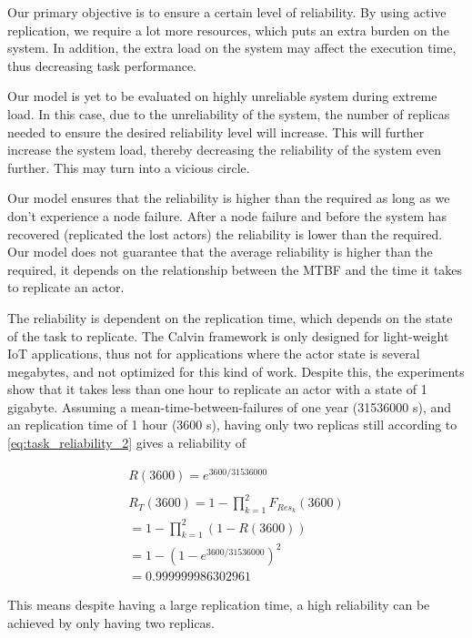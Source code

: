 \documentclass{cslthse-msc}
\begin{document}
Our primary objective is to ensure a certain level of reliability. By using active replication, we require a lot more resources, which puts an extra burden on the system. In addition, the extra load on the system may affect the execution time, thus decreasing task performance.

Our model is yet to be evaluated on highly unreliable system during extreme load. In this case, due to the unreliability of the system, the number of replicas needed to ensure the desired reliability level will increase. This will further increase the system load, thereby decreasing the reliability of the system even further. This may turn into a vicious circle.

Our model ensures that the reliability is higher than the required as long as we don't experience a node failure. After a node failure and before the system has recovered (replicated the lost actors) the reliability is lower than the required. Our model does not guarantee that the average reliability is higher than the required, it depends on the relationship between the MTBF and the time it takes to replicate an actor.

The reliability is dependent on the replication time, which depends on the state of the task to replicate. The Calvin framework is only designed for light-weight IoT applications, thus not for applications where the actor state is several megabytes, and not optimized for this kind of work. Despite this, the experiments show that it takes less than one hour to replicate an actor with a state of 1 gigabyte. Assuming a mean-time-between-failures of one year (31536000 s), and an replication time of 1 hour (3600 s), having only two replicas still according to \cref{eq:task_reliability_2} gives a reliability of

\begin{equation*}
\begin{split}
R(3600) = e^{3600/31536000}\\
\\
R_{T}(3600) = 1 - \prod\limits_{k=1}^2  F_{Res_k}(3600)\\
= 1 - \prod\limits_{k=1}^2  (1 - R(3600))\\
= 1 - (1 - e^{3600/31536000})^2\\
=  0.999999986302961
\end{split}
\end{equation*}

This means despite having a large replication time, a high reliability can be achieved by only having two replicas.
\end{document}
